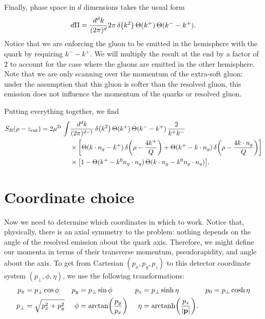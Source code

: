 \documentclass[11pt,twoside,reqno]{amsart}
\theoremstyle{plain}
\theoremstyle{remark}
\theoremstyle{definition}
\theoremstyle{remark}
\theoremstyle{definition}
\theoremstyle{definition}
\newcommand{\zcut}{z_\mathrm{cut}}
\newcommand{\arctanh}{\mathrm{arctanh}}
\begin{document}
	Finally, phase space in $d$ dimensions takes the usual form
	\begin{equation}
		d\Pi = \frac{d^d k}{(2\pi)^d} 2\pi\,\delta\qty(k^2)\,\Theta(k^+)\,\Theta(k^- - k^+).
	\end{equation}
	Notice that we are enforcing the gluon to be emitted in the hemisphere with the quark by requiring $k^- - k^+$. We will multiply the result at the end by a factor of $2$ to account for the case where the gluons are emitted in the other hemisphere. Note that we are only scanning over the momentum of the extra-soft gluon: under the assumption that this gluon is softer than the resolved gluon, this emission does not influence the momentum of the quarks or resolved gluon.

	Putting everything together, we find
	\begin{equation}\label{eq:soft integral}
	\begin{aligned}
		S_R(\rho - \zcut) = 2 \mu^{2\epsilon} \int& \frac{d^d k}{(2\pi)^{d-1}} \, \delta\qty(k^2)\,\Theta(k^+)\,\Theta(k^- - k^+) \,\frac{2}{k^+ k^-} \\
		&\times \qty[\Theta(k\cdot n_g - k^+)\,\delta\qty(\rho - \frac{4k^+}{Q}) + \Theta(k^+ - k\cdot n_g)\,\delta\qty(\rho - \frac{4k\cdot n_g}{Q})] \\
		&\times \qty[1 - \Theta(k^+ - k^0 n_g \cdot n_q)\,\Theta(k \cdot n_g - k^0 n_g \cdot n_q)].
	\end{aligned}
	\end{equation}

\section{Coordinate choice}
	Now we need to determine which coordinates in which to work. Notice that, physically, there is an axial symmetry to the problem: nothing depends on the angle of the resolved emission about the quark axis. Therefore, we might define our momenta in terms of their transverse momentum, pseudorapidity, and angle about the axis. To get from Cartesian $(p_x, p_y, p_z)$ to this detector coordinate system $(p_\perp, \phi, \eta)$, we use the following transformations:
	\begin{equation}
	\begin{aligned}
		p_x &= p_\perp \cos\phi & p_y &= p_\perp \sin\phi & p_z &= p_\perp \sinh\eta & p_0 &= p_\perp \cosh\eta \\
		p_\perp &= \sqrt{p_x^2 + p_y^2} & \phi &= \arctan(\frac{p_y}{p_x}) & \eta &= \arctanh\qty(\frac{p_z}{\abs{\vb{p}}}).
	\end{aligned}
	\end{equation}
\end{document}
